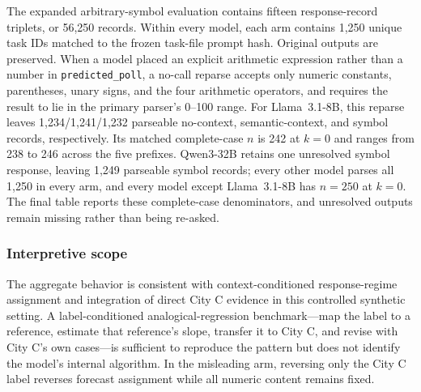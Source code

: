 The expanded arbitrary-symbol evaluation contains fifteen response-record
triplets, or 56,250 records. Within every model, each arm contains 1,250
unique task IDs matched to the frozen task-file prompt hash. Original outputs are
preserved. When a model placed an explicit arithmetic expression rather than a
number in \texttt{predicted\_poll}, a no-call reparse accepts only numeric constants,
parentheses, unary signs, and the four arithmetic operators, and requires
the result to lie in the primary parser's 0--100 range. For Llama~3.1-8B, this
reparse leaves 1,234/1,241/1,232 parseable no-context, semantic-context, and
symbol records, respectively. Its matched complete-case $n$ is 242 at $k=0$ and
ranges from 238 to 246 across the five prefixes. Qwen3-32B retains one
unresolved symbol response, leaving 1,249 parseable symbol records; every other
model parses all 1,250 in every arm, and every model except Llama~3.1-8B has
$n=250$ at $k=0$. The final table reports these complete-case denominators, and unresolved
outputs remain missing rather than being re-asked.

\subsubsection{Interpretive scope}
The aggregate behavior is consistent with context-conditioned response-regime
assignment and integration of direct City C evidence in this controlled synthetic
setting. A label-conditioned analogical-regression benchmark---map the label to a
reference, estimate that reference's slope, transfer it to City C, and revise
with City C's own cases---is sufficient to reproduce the pattern but does not
identify the model's internal algorithm. In the misleading arm, reversing only
the City C label reverses forecast assignment while all numeric content remains
fixed.

